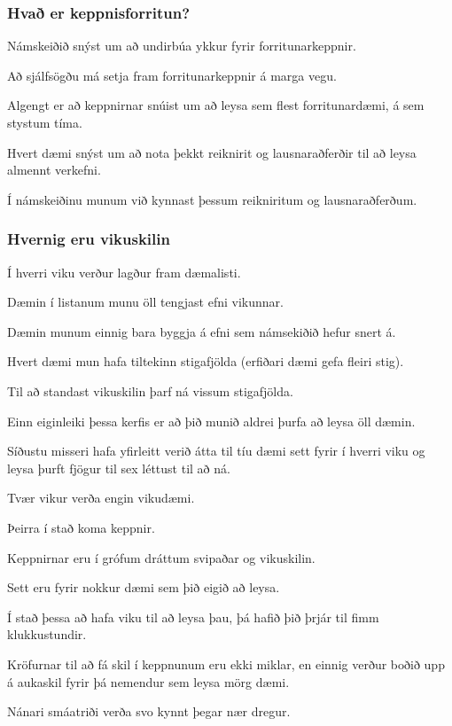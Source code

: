 {
	\frametitle{Hvað er keppnisforritun?}
	{
		\item<1-> Námskeiðið snýst um að undirbúa ykkur fyrir forritunarkeppnir.
		\item<2-> Að sjálfsögðu má setja fram forritunarkeppnir á marga vegu.
		\item<3-> Algengt er að keppnirnar snúist um að leysa sem flest forritunardæmi, á sem stystum tíma.
		\item<4-> Hvert dæmi snýst um að nota þekkt reiknirit og lausnaraðferðir til að leysa almennt verkefni.
		\item<5-> Í námskeiðinu munum við kynnast þessum reikniritum og lausnaraðferðum.
	}
}

{
	\frametitle{Hvernig eru vikuskilin}
	{
		\item<1-> Í hverri viku verður lagður fram dæmalisti.
		\item<2-> Dæmin í listanum munu öll tengjast efni vikunnar.
		\item<3-> Dæmin munum einnig bara byggja á efni sem námsekiðið hefur snert á.
		\item<4-> Hvert dæmi mun hafa tiltekinn stigafjölda (erfiðari dæmi gefa fleiri stig).
		\item<5-> Til að standast vikuskilin þarf ná vissum stigafjölda.
		\item<6-> Einn eiginleiki þessa kerfis er að þið munið aldrei þurfa að leysa öll dæmin.
		\item<7-> Síðustu misseri hafa yfirleitt verið átta til tíu dæmi sett fyrir í hverri viku og leysa þurft fjögur til sex léttust til að ná.
	}
}

{
	{
		\item<1-> Tvær vikur verða engin vikudæmi.
		\item<2-> Þeirra í stað koma keppnir.
		\item<3-> Keppnirnar eru í grófum dráttum svipaðar og vikuskilin.
		\item<4-> Sett eru fyrir nokkur dæmi sem þið eigið að leysa.
		\item<5-> Í stað þessa að hafa viku til að leysa þau, þá hafið þið þrjár til fimm klukkustundir.
		\item<6-> Kröfurnar til að fá skil í keppnunum eru ekki miklar, en einnig verður boðið upp á aukaskil fyrir þá nemendur sem leysa mörg dæmi.
		\item<7-> Nánari smáatriði verða svo kynnt þegar nær dregur.
	}
}


